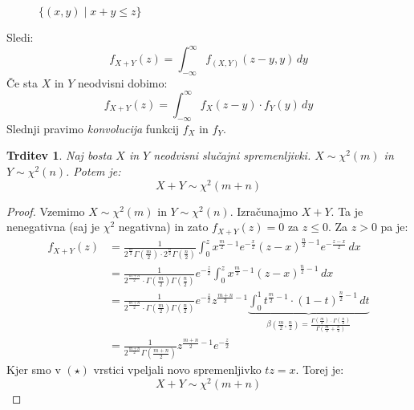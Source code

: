 \documentclass[12pt]{book}
\def\n{\noindent}
\theoremstyle{definition}
\theoremstyle{plain}
\theoremstyle{plain}
\newtheorem{trditev}{Trditev}
\theoremstyle{plain}
\theoremstyle{plain}
\theoremstyle{remark}
\begin{document}
\begin{zgled}
\begin{figure}[H]
    
        \caption{$\{(x,y)  \mid x+y \leq z\}$}
        \label{fig:7}
    \end{figure}
    
    \n Sledi: 
    $$
    f_{X+Y}(z)=\int_{-\infty}^{\infty} f_{(X, Y)}(z-y, y) \, d y
    $$
    Če sta $X$ in $Y$ neodvisni dobimo:
    $$
    f_{X+Y}(z)=\int_{-\infty}^{\infty} f_X(z-y) \cdot f_Y(y) \,d y
    $$
    Slednji pravimo \emph{konvolucija} funkcij $f_X$ in $f_Y$. 
\end{zgled}

\begin{trditev}
    Naj bosta $X$ in $Y$ neodvisni slučajni spremenljivki. $X \sim \chi^2(m)$ in $Y \sim \chi^2(n)$. Potem je: 
    $$
    X+Y \sim \chi^2(m+n)
    $$
\end{trditev}

\begin{proof}
    Vzemimo $X \sim \chi^2(m)$ in $Y \sim \chi^2(n)$. Izračunajmo $X+Y$. Ta je nenegativna (saj je $\chi^2$ negativna) in zato $f_{X+Y}(z)=0$ za $z \leq 0$. Za $z>0$ pa je: 
    \begin{align*}
        f_{X+Y}(z) &= \frac{1}{2^{\frac{m}{2}} \Gamma\left(\frac{m}{2}\right) \cdot 2^{\frac{n}{2}} \Gamma\left(\frac{n}{2}\right)} \int_0^{z} x^{\frac{m}{2}-1} e^{-\frac{x}{2}}(z-x)^{\frac{n}{2}-1} e^{-\frac{z-x}{2}} \, dx \\
        &=\frac{1}{2^{\frac{m+n}{2}} \cdot \Gamma\left(\frac{m}{2}\right) \Gamma\left(\frac{n}{2}\right)} e^{-\frac{z}{2}} \int_0^z x^{\frac{m}{2}-1}(z-x)^{\frac{n}{2}-1} \, d x \tag{$\star$} \\
        &=\frac{1}{2^{\frac{m+n}{2}} \cdot \Gamma\left(\frac{m}{2}\right) \Gamma\left(\frac{n}{2}\right)} e^{-\frac{z}{2}} z^{\frac{m+n}{2}-1} \underbrace{\int_0^1 t^{\frac{m}{2}-1} \cdot(1-t)^{\frac{n}{2}-1} \, d t}_{\beta(\frac{m}{2}, \frac{n}{2}) = \frac{\Gamma\left(\frac{m}{2}\right) \cdot \Gamma\left(\frac{n}{2}\right)}{\Gamma\left(\frac{m}{2}+\frac{n}{2}\right)}} \\
        &=\frac{1}{2^{\frac{m+n}{2}}\Gamma\left(\frac{m+n}{2}\right)} z^{\frac{m+n}{2}-1} e^{-\frac{z}{2}} 
    \end{align*}
    Kjer smo v $(\star)$ vrstici vpeljali novo spremenljivko $tz=x$. Torej je: 
    $$
    X+Y \sim \chi^2(m+n)
    $$
\end{proof}
\end{document}

